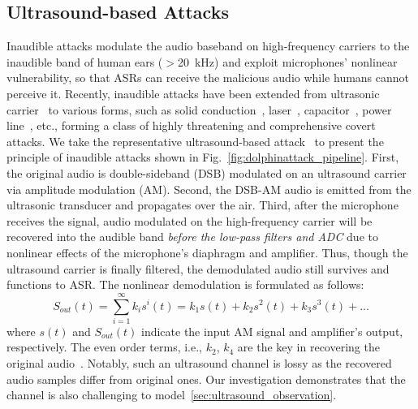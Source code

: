 \subsection{Ultrasound-based Attacks}\label{background_vulnerability_VCS}
Inaudible attacks modulate the audio baseband on high-frequency carriers to the inaudible band of human ears ($>$20~kHz) and exploit microphones' nonlinear vulnerability, so that ASRs can receive the malicious audio while humans cannot perceive it.
Recently, inaudible attacks have been extended from ultrasonic carrier~\cite{zhang2017dolphinattack,roy2018inaudible} to various forms, such as solid conduction~\cite{yan2020surfingattack}, laser~\cite{sugawara2020light}, capacitor~\cite{zhang2021capspeaker}, power line~\cite{wang2022ghosttalk}, etc., forming a class of highly threatening and comprehensive covert attacks. %
We take the representative ultrasound-based attack~\cite{zhang2017dolphinattack} to present the principle of inaudible attacks shown in Fig.~\ref{fig:dolphinattack_pipeline}.
First, the original audio is double-sideband (DSB) modulated on an ultrasound carrier via amplitude modulation (AM). Second, the DSB-AM audio is emitted from the ultrasonic transducer and propagates over the air. Third, after the microphone receives the signal, audio modulated on the high-frequency carrier will be recovered into the audible band \textit{before the low-pass filters and ADC} due to nonlinear effects of the microphone's diaphragm and amplifier. Thus, though the ultrasound carrier is finally filtered, the demodulated audio still survives and functions to ASR.
The nonlinear demodulation is formulated as follows: 
\begin{equation}\label{equ:nonlinearity}
    S_{out}(t) = \sum_{i=1}^{\infty}k_{i}s^{i}(t)=k_1 s(t) + k_2 s^2(t) + k_3 s^3(t) + ...
\end{equation}
where $s(t)$ and $S_{out}(t)$ indicate the input AM signal and amplifier's output, respectively. %
The even order terms, i.e., $k_2$, $k_4$ are the key in recovering the original audio~\cite{roy2017backdoor}.
Notably, such an ultrasound channel is lossy as the recovered audio samples differ from original ones. Our investigation demonstrates that the channel is also challenging to model~\ref{sec:ultrasound_observation}.